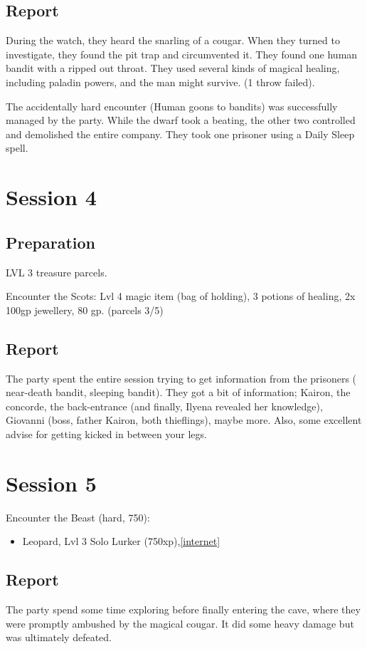 \section{Report}
During the watch, they heard the snarling of a cougar. When they turned to investigate, they found the pit trap and circumvented it. They found one human bandit with a ripped out throat. They used several kinds of magical healing, including paladin powers, and the man might survive. (1 throw failed).

The accidentally hard encounter (Human goons to bandits) was successfully managed by the party. While the dwarf took a beating, the other two controlled and demolished the entire company. They took one prisoner using a Daily Sleep spell. 

\chapter{Session 4}
\section{Preparation}
LVL 3 treasure parcels. 

Encounter the Scots: Lvl 4 magic item (bag of holding), 3 potions of healing, 2x 100gp jewellery, 80 gp. (parcels 3/5)

\section{Report}
The party spent the entire session trying to get information from the prisoners ( near-death bandit, sleeping bandit). They got a bit of information; Kairon, the concorde, the back-entrance (and finally, Ilyena revealed her knowledge), Giovanni (boss, father Kairon, both thieflings), maybe more. Also, some excellent advise for getting kicked in between your legs.


\chapter{Session 5}
Encounter the Beast (hard, 750):
\begin{itemize}
\item Leopard, Lvl 3 Solo Lurker (750xp),\href{http://www.dandwiki.com/wiki/Wild_Cats_(4e_Creature)}{[internet]}
\end{itemize}
\section{Report}
The party spend some time exploring before finally entering the cave, where they were promptly ambushed by the magical cougar. It did some heavy damage but was ultimately defeated.


